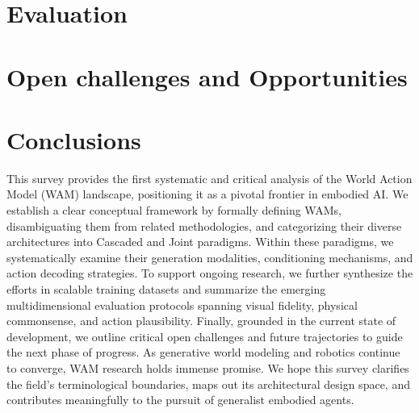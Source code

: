 \documentclass[]{openmoss}
\begin{document}
\section{Evaluation}




\section{Open challenges and Opportunities}






\section{Conclusions}
This survey provides the first systematic and critical analysis of the World Action Model (WAM) landscape, positioning it as a pivotal frontier in embodied AI. We establish a clear conceptual framework by formally defining WAMs, disambiguating them from related methodologies, and categorizing their diverse architectures into Cascaded and Joint paradigms. Within these paradigms, we systematically examine their generation modalities, conditioning mechanisms, and action decoding strategies. To support ongoing research, we further synthesize the efforts in scalable training datasets and summarize the emerging multidimensional evaluation protocols spanning visual fidelity, physical commonsense, and action plausibility. Finally, grounded in the current state of development, we outline critical open challenges and future trajectories to guide the next phase of progress. As generative world modeling and robotics continue to converge, WAM research holds immense promise. We hope this survey clarifies the field’s terminological boundaries, maps out its architectural design space, and contributes meaningfully to the pursuit of generalist embodied agents.




\clearpage
% 



\end{document}

